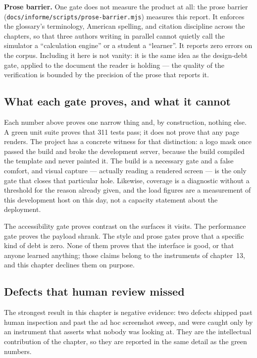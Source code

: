 \textbf{Prose barrier.} One gate does not measure the product at all: the prose barrier
(\verb|docs/informe/scripts/prose-barrier.mjs|) measures this report. It enforces the glossary's
terminology, American spelling, and citation discipline across the chapters, so that three authors
writing in parallel cannot quietly call the simulator a \enquote{calculation engine} or a student a
\enquote{learner}. It reports zero errors on the corpus. Including it here is not vanity: it is the
same idea as the design-debt gate, applied to the document the reader is holding — the quality of
the verification is bounded by the precision of the prose that reports it.

\subsection{What each gate proves, and what it cannot}

Each number above proves one narrow thing and, by construction, nothing else. A green unit suite
proves that 311 tests pass; it does not prove that any page renders. The project has a concrete
witness for that distinction: a logo mask once passed the build and broke the development server,
because the build compiled the template and never painted it. The build is a necessary gate and a
false comfort, and visual capture — actually reading a rendered screen — is the only gate that
closes that particular hole. Likewise, coverage is a diagnostic without a threshold for the reason
already given, and the load figures are a measurement of this development host on this day, not a
capacity statement about the deployment.

The accessibility gate proves contrast on the surfaces it visits. The performance gate proves the
payload shrank. The style and prose gates prove that a specific kind of debt is zero. None of them
proves that the interface is good, or that anyone learned anything; those claims belong to the
instruments of chapter~13, and this chapter declines them on purpose.

\subsection{Defects that human review missed}

The strongest result in this chapter is negative evidence: two defects shipped past human
inspection and past the ad hoc screenshot sweep, and were caught only by an instrument that asserts
what nobody was looking at. They are the intellectual contribution of the chapter, so they are
reported in the same detail as the green numbers.

